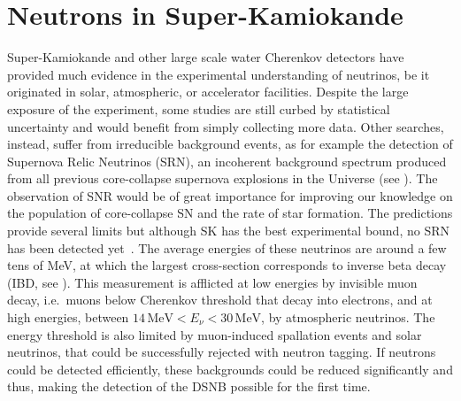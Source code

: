 \section{Neutrons in Super-Kamiokande}
\label{sec:sk_neutron}

Super-Kamiokande and other large scale water Cherenkov detectors have provided %
much evidence in the experimental understanding of neutrinos, %
be it originated in solar, atmospheric, or accelerator facilities.
Despite the large exposure of the experiment, some studies are still curbed by statistical uncertainty %
and would benefit from simply collecting more data.
Other searches, instead, suffer from irreducible background events, as for example the detection of Supernova Relic Neutrinos (SRN), %
an incoherent background spectrum produced from all previous core-collapse supernova explosions in the Universe (see ).
The observation of SNR would be of great importance for improving our knowledge on the population of core-collapse SN %
and the rate of star formation.
The predictions provide several limits but although SK has the best experimental bound, no SRN has been detected %
yet~\cite{Bays:2011si, Zhang:2013tua}.
The average energies of these neutrinos are around a few tens of MeV, at which the largest cross-section %
corresponds to inverse beta decay (IBD, see ).
This measurement is afflicted at low energies by invisible muon decay, %
i.e.\ muons below Cherenkov threshold that decay into electrons, and at high energies, %
between $14\,\text{MeV} < E_\nu < 30\,\text{MeV}$, by atmospheric neutrinos.
The energy threshold is also limited by muon-induced spallation events and solar neutrinos, that could be successfully %
rejected with neutron tagging.
If neutrons could be detected efficiently, these backgrounds could be reduced significantly and thus, %
making the detection of the DSNB possible for the first time.

